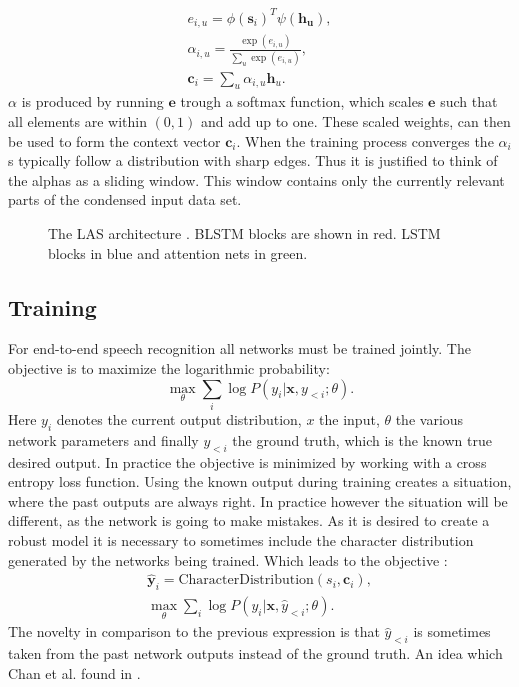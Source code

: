 \begin{align}
e_{i,u} = \phi(\mathbf{s}_i)^T \psi(\mathbf{h_u}), \\
\alpha_{i,u} = \frac{ \exp(e_{i,u})}{ \sum\limits_{u} \exp(e_{i,u})}, \\
\label{eq:alphas}
\mathbf{c}_i = \sum\limits_{u} \alpha_{i,u} \mathbf{h}_u.
\end{align}
$\alpha$ is produced by running $\mathbf{e}$ trough a softmax function, which scales $\mathbf{e}$ such that all elements are within $(0,1)$ and add up to one. These scaled weights, can then be used to form the context vector $\mathbf{c}_i$. When the training process converges the $\alpha_i$s typically follow a distribution with sharp edges\cite[page 5]{Chan2015}. Thus it is justified to think of the alphas as a sliding window. This window contains only the currently relevant parts of the condensed input data set.

\begin{figure}

\caption{The LAS architecture \cite[page 3]{Chan2015}. BLSTM blocks are shown in red. LSTM blocks in blue and attention nets in green.}
\label{fig:las}
\end{figure}

\subsection{Training}
For end-to-end speech recognition all networks must be trained jointly. The objective is to maximize the logarithmic probability:
\begin{equation}
\max\limits_\theta \sum\limits_{i} \log P(y_i | \mathbf{x}, y_{<i};\theta).
\end{equation}
Here $y_i$ denotes the current output distribution, $x$ the input, $\theta$ the various network parameters and finally $y_{<i}$ the ground truth, which is the known true desired output. In practice the objective is minimized by working with a cross entropy loss function.
Using the known output during training creates a situation, where the past outputs are always right. In practice however the situation will be different, as the network is going to make mistakes. As it is desired to create a robust model it is necessary to sometimes include the character distribution generated by the networks being trained.
Which leads to the objective \cite[page 5]{Chan2015}:
\begin{align}
\hat{\mathbf{y}}_{i} = \text{CharacterDistribution}(s_i,\textbf{c}_i), \\
\max_{\theta} \sum\limits_{i} \log P(y_i|\mathbf{x}, \hat{y}_{<i};\theta).
\end{align}
The novelty in comparison to the previous expression is that $\hat{y}_{<i}$ is sometimes taken from the past network outputs instead of the ground truth. An idea which Chan et al. found in \cite{Bengio2015}.

